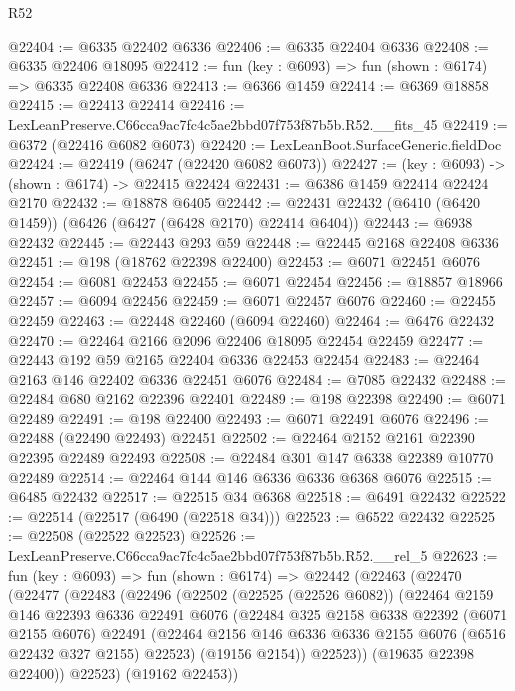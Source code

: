 \begin{lexlean}{R52}
\begin{coremodule}
@22404 := @6335 @22402 @6336
@22406 := @6335 @22404 @6336
@22408 := @6335 @22406 @18095
@22412 := fun (key : @6093) => fun (shown : @6174) => @6335 @22408 @6336
@22413 := @6366 @1459
@22414 := @6369 @18858
@22415 := @22413 @22414
@22416 := LexLeanPreserve.C66cca9ac7fc4c5ae2bbd07f753f87b5b.R52.__fits_45
@22419 := @6372 (@22416 @6082 @6073)
@22420 := LexLeanBoot.SurfaceGeneric.fieldDoc
@22424 := @22419 (@6247 (@22420 @6082 @6073))
@22427 := (key : @6093) -> (shown : @6174) -> @22415 @22424
@22431 := @6386 @1459 @22414 @22424 @2170
@22432 := @18878 @6405
@22442 := @22431 @22432 (@6410 (@6420 @1459)) (@6426 (@6427 (@6428 @2170) @22414 @6404))
@22443 := @6938 @22432
@22445 := @22443 @293 @59
@22448 := @22445 @2168 @22408 @6336
@22451 := @198 (@18762 @22398 @22400)
@22453 := @6071 @22451 @6076
@22454 := @6081 @22453
@22455 := @6071 @22454
@22456 := @18857 @18966
@22457 := @6094 @22456
@22459 := @6071 @22457 @6076
@22460 := @22455 @22459
@22463 := @22448 @22460 (@6094 @22460)
@22464 := @6476 @22432
@22470 := @22464 @2166 @2096 @22406 @18095 @22454 @22459
@22477 := @22443 @192 @59 @2165 @22404 @6336 @22453 @22454
@22483 := @22464 @2163 @146 @22402 @6336 @22451 @6076
@22484 := @7085 @22432
@22488 := @22484 @680 @2162 @22396 @22401
@22489 := @198 @22398
@22490 := @6071 @22489
@22491 := @198 @22400
@22493 := @6071 @22491 @6076
@22496 := @22488 (@22490 @22493) @22451
@22502 := @22464 @2152 @2161 @22390 @22395 @22489 @22493
@22508 := @22484 @301 @147 @6338 @22389 @10770 @22489
@22514 := @22464 @144 @146 @6336 @6336 @6368 @6076
@22515 := @6485 @22432
@22517 := @22515 @34 @6368
@22518 := @6491 @22432
@22522 := @22514 (@22517 (@6490 (@22518 @34)))
@22523 := @6522 @22432
@22525 := @22508 (@22522 @22523)
@22526 := LexLeanPreserve.C66cca9ac7fc4c5ae2bbd07f753f87b5b.R52.__rel_5
@22623 := fun (key : @6093) =>
  fun (shown : @6174) =>
  @22442
    (@22463
      (@22470
        (@22477
          (@22483
            (@22496
              (@22502
                (@22525 (@22526 @6082))
                (@22464
                  @2159
                  @146
                  @22393
                  @6336
                  @22491
                  @6076
                  (@22484
                    @325
                    @2158
                    @6338
                    @22392
                    (@6071 @2155 @6076)
                    @22491
                    (@22464 @2156 @146 @6336 @6336 @2155 @6076 (@6516 @22432 @327 @2155) @22523)
                    (@19156 @2154))
                  @22523))
              (@19635 @22398 @22400))
            @22523)
          (@19162 @22453))

\end{coremodule}
\end{lexlean}

